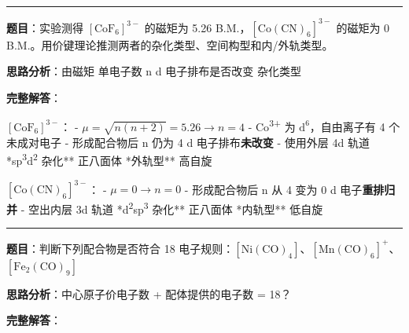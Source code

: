 \begin{center}\rule{0.5\linewidth}{0.5pt}\end{center}

\textbf{题目}：实验测得 \([\mathrm{CoF_6}]^{3-}\) 的磁矩为 5.26 B.M.，\([\mathrm{Co(CN)_6}]^{3-}\) 的磁矩为 0 B.M.。用价键理论推测两者的杂化类型、空间构型和内/外轨类型。

\textbf{思路分析}：由磁矩 \箭 单电子数 n \箭 d 电子排布是否改变 \箭 杂化类型

\textbf{完整解答}：

\textbf{\([\mathrm{CoF_6}]^{3-}\)}：
- \(\mu = \sqrt{n(n+2)} = 5.26 \rightarrow n = 4\)
- Co\textsuperscript{3+} 为 \(\mathrm{d^6}\)，自由离子有 4 个未成对电子
- 形成配合物后 n 仍为 4 \箭 d 电子排布\textbf{未改变}
- 使用外层 4d 轨道 \箭 **sp\textsuperscript{3}d\textsuperscript{2} 杂化** \箭 正八面体 \箭 **外轨型** \箭 高自旋

\textbf{\([\mathrm{Co(CN)_6}]^{3-}\)}：
- \(\mu = 0 \rightarrow n = 0\)
- 形成配合物后 n 从 4 变为 0 \箭 d 电子\textbf{重排归并}
- 空出内层 3d 轨道 \箭 **d\textsuperscript{2}sp\textsuperscript{3} 杂化** \箭 正八面体 \箭 **内轨型** \箭 低自旋

\begin{center}\rule{0.5\linewidth}{0.5pt}\end{center}

\textbf{题目}：判断下列配合物是否符合 18 电子规则：\(\mathrm{[Ni(CO)_4]}\)、\(\mathrm{[Mn(CO)_6]^+}\)、\(\mathrm{[Fe_2(CO)_9]}\)

\textbf{思路分析}：中心原子价电子数 + 配体提供的电子数 = 18？

\textbf{完整解答}：

